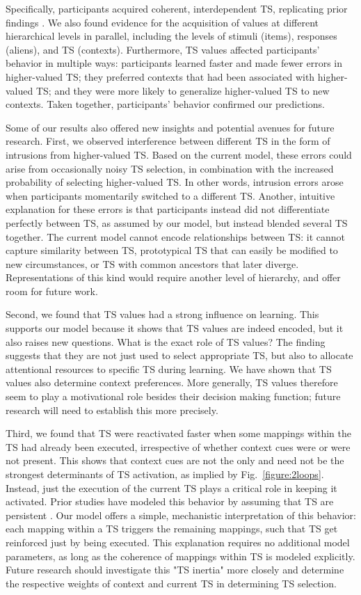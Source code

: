 \documentclass[10pt, letterpaper]{article}
\begin{document}
Specifically, participants acquired coherent, interdependent TS, replicating prior findings \cite{collins_reasoning_2012, collins_cognitive_2013}. We also found evidence for the acquisition of values at different hierarchical levels in parallel, including the levels of stimuli (items), responses (aliens), and TS (contexts). Furthermore, TS values affected participants' behavior in multiple ways: participants learned faster and made fewer errors in higher-valued TS; they preferred contexts that had been associated with higher-valued TS; and they were more likely to generalize higher-valued TS to new contexts. Taken together, participants' behavior confirmed our predictions.

Some of our results also offered new insights and potential avenues for future research. First, we observed interference between different TS in the form of intrusions from higher-valued TS. Based on the current model, these errors could arise from occasionally noisy TS selection, in combination with the increased probability of selecting higher-valued TS. In other words, intrusion errors arose when participants momentarily switched to a different TS. Another, intuitive explanation for these errors is that participants instead did not differentiate perfectly between TS, as assumed by our model, but instead blended several TS together. The current model cannot encode relationships between TS: it cannot capture similarity between TS, prototypical TS that can easily be modified to new circumstances, or TS with common ancestors that later diverge. Representations of this kind would require another level of hierarchy, and offer room for future work.

Second, we found that TS values had a strong influence on learning. This supports our model because it shows that TS values are indeed encoded, but it also raises new questions. What is the exact role of TS values? The finding suggests that they are not just used to select appropriate TS, but also to allocate attentional resources to specific TS during learning. We have shown that TS values also determine context preferences. More generally, TS values therefore seem to play a motivational role besides their decision making function; future research will need to establish this more precisely.

Third, we found that TS were reactivated faster when some mappings within the TS had already been executed, irrespective of whether context cues were or were not present. This shows that context cues are not the only and need not be the strongest determinants of TS activation, as implied by Fig.~\ref{figure:2loops}. Instead, just the execution of the current TS plays a critical role in keeping it activated. Prior studies have modeled this behavior by assuming that TS are persistent \cite{collins_reasoning_2012}. Our model offers a simple, mechanistic interpretation of this behavior: each mapping within a TS triggers the remaining mappings, such that TS get reinforced just by being executed. This explanation requires no additional model parameters, as long as the coherence of mappings within TS is modeled explicitly. Future research should investigate this "TS inertia" more closely and determine the respective weights of context and current TS in determining TS selection. 
\end{document}
